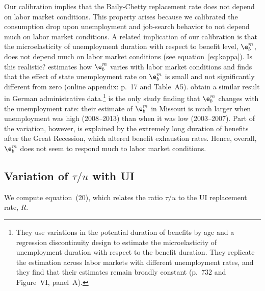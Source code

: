 \documentclass[letterpaper,12pt,leqno]{article}
\begin{document}
Our calibration implies that the Baily-Chetty replacement rate does not depend on labor market conditions. This property arises because we calibrated the consumption drop upon unemployment and job-search behavior to not depend much on labor market conditions. A related implication of our calibration is that  the microelasticity of unemployment duration with respect to benefit level, $\e^m_b$, does not depend much on labor market conditions (see equation~\eqref{eq:kappa}). Is this realistic? \citet{L11} estimates how  $\e^{m}_{b}$ varies with labor market conditions and finds that the effect of state unemployment rate on $\e^{m}_{b}$ is small and not significantly different from zero (online appendix: p.~17 and Table~A5). \citet{SWB09} obtain a similar result in German administrative data.\footnote{They use variations in the potential duration of benefits by age and a regression discontinuity design to estimate the microelasticity of unemployment duration with respect to the benefit duration. They replicate the estimation across labor markets with different unemployment rates, and they find that their estimates remain broadly constant (p.~732 and Figure~VI, panel~A).} \citet{CJL15} is the only study finding that $\e^{m}_{b}$ changes with the unemployment rate: their estimate of $\e^{m}_{b}$ in Missouri is much larger when unemployment was high (2008--2013) than when it was low (2003--2007). Part of the variation, however, is explained by the extremely long duration of benefits after the Great Recession, which altered benefit exhaustion rates. Hence, overall, $\e^{m}_{b}$ does not seem to respond much to labor market conditions.

\subsection{Variation of $\tau/u$ with UI}

We compute equation~(20), which relates the ratio $\tau/u$ to the UI replacement rate, $R$.
\end{document}
